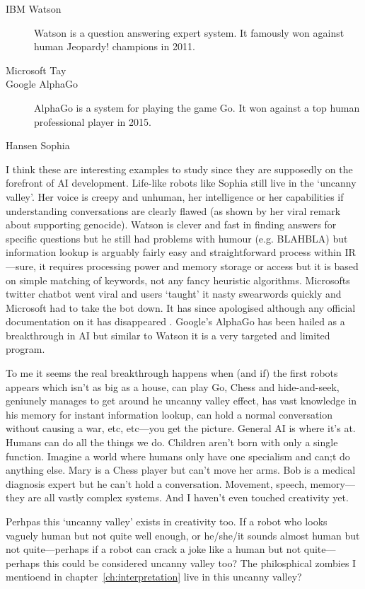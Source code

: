 \documentclass[11pt]{thesis} %
\begin{document}
\begin{description}
  \item[IBM Watson] Watson is a question answering expert system. It famously won against human Jeopardy! champions in 2011.
  \item[Microsoft Tay] 
  \item[Google AlphaGo] AlphaGo is a system for playing the game Go. It won against a top human professional player in 2015.
  \item[Hansen Sophia]
\end{description}

I think these are interesting examples to study since they are supposedly on the forefront of \ac{AI} development. Life-like robots like Sophia still live in the `uncanny valley'. Her voice is creepy and unhuman, her intelligence or her capabilities if understanding conversations are clearly flawed (as shown by her viral remark about supporting genocide). Watson is clever and fast in finding answers for specific questions but he still had problems with humour (e.g. BLAHBLA) but information lookup is arguably fairly easy and straightforward process within \ac{IR}---sure, it requires processing power and memory storage or access but it is based on simple matching of keywords, not any fancy heuristic algorithms. Microsofts twitter chatbot went viral and users `taught' it nasty swearwords  quickly and Microsoft had to take the bot down. It has since apologised although any official documentation on it has disappeared . Google's AlphaGo has been hailed as a breakthrough in \ac{AI} but similar to Watson it is a very targeted and limited program. 

To me it seems the real breakthrough happens when (and if) the first robots appears which isn't as big as a house, can play Go, Chess and hide-and-seek, geniunely manages to get around he uncanny valley effect, has vast knowledge in his memory for instant information lookup, can hold a normal conversation without causing a war, etc, etc---you get the picture. General \ac{AI} is where it's at. Humans can do all the things we do. Children aren't born with only a single function. Imagine a world where humans only have one specialism and can;t do anything else. Mary is a Chess player but can't move her arms. Bob is a medical diagnosis expert but he can't hold a conversation. Movement, speech, memory---they are all vastly complex systems. And I haven't even touched creativity yet.

Perhpas this `uncanny valley' exists in creativity too. If a robot who looks vaguely human but not quite well enough, or he/she/it sounds almost human but not quite---perhaps if a robot can crack a joke like a human but not quite---perhaps this could be considered uncanny valley too? The philosphical zombies I mentioend in chapter~\ref{ch:interpretation} live in this uncanny valley?
\end{document}
